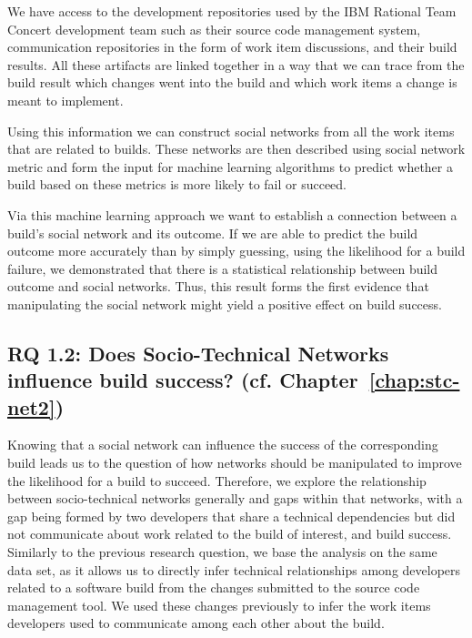 We have access to the development repositories used by the IBM Rational Team Concert development team such as their source code management system, communication repositories in the form of work item discussions, and their build results.
All these artifacts are linked together in a way that we can trace from the build result which changes went into the build and which work items a change is meant to implement.

Using this information we can construct social networks from all the work items that are related to builds.
These networks are then described using social network metric and form the input for machine learning algorithms to predict whether a build based on these metrics is more likely to fail or succeed.

Via this machine learning approach we want to establish a connection between a build's social network and its outcome. 
If we are able to predict the build outcome more accurately than by simply guessing, using the likelihood for a build failure, we demonstrated that there is a statistical relationship between build outcome and social networks.
Thus, this result forms the first evidence that manipulating the social network might yield a positive effect on build success.

\subsection{%
  RQ 1.2: Does Socio-Technical Networks influence build success? (cf. Chapter~\ref{chap:stc-net2})}

Knowing that a social network can influence the success of the corresponding build leads us to the question of how networks should be manipulated to improve the likelihood for a build to succeed.
Therefore, we explore the relationship between socio-technical networks generally and gaps within that networks, with a gap being formed by two developers that share a technical dependencies but did not communicate about work related to the build of interest, and build success.
Similarly to the previous research question, we base the analysis on the same data set, as it allows us to directly infer technical relationships among developers related to a software build from the changes submitted to the source code management tool.
We used these changes previously to infer the work items developers used to communicate among each other about the build.

